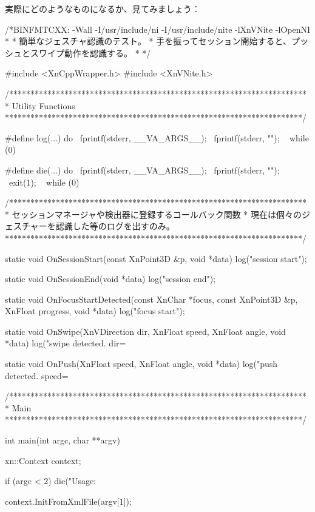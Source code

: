 \documentclass[mingoth,a4paper]{jsarticle}
\begin{document}
実際にどのようなものになるか、見てみましょう：
\begin{commandline}
/*BINFMTCXX: -Wall -I/usr/include/ni -I/usr/include/nite -lXnVNite -lOpenNI
 *
 * 簡単なジェスチャ認識のテスト。
 * 手を振ってセッション開始すると、プッシュとスワイプ動作を認識する。
 *
 */

#include <XnCppWrapper.h>
#include <XnVNite.h>

/**********************************************************************
 * Utility Functions
 **********************************************************************/

#define log(...) do {                       \
        fprintf(stderr, __VA_ARGS__);       \
        fprintf(stderr, "\n");              \
    } while (0)

#define die(...) do {                       \
        fprintf(stderr, __VA_ARGS__);       \
        fprintf(stderr, "\n");              \
        exit(1);                            \
    } while (0)

/**********************************************************************
 * セッションマネージャや検出器に登録するコールバック関数
 * 現在は個々のジェスチャーを認識した等のログを出すのみ。
 **********************************************************************/

static void
OnSessionStart(const XnPoint3D &p, void *data) {
    log("session start");
}

static void
OnSessionEnd(void *data) {
    log("session end");
}

static void
OnFocusStartDetected(const XnChar *focus,
                     const XnPoint3D &p, XnFloat progress, void *data) {
    log("focus start");
}

static void
OnSwipe(XnVDirection dir, XnFloat speed, XnFloat angle, void *data) {
    log("swipe detected. dir=%
}

static void
OnPush(XnFloat speed, XnFloat angle, void *data) {
    log("push detected. speed=%
}

/**********************************************************************
 * Main
 **********************************************************************/

int
main(int argc, char **argv) {
    xn::Context context;

    if (argc < 2) {
        die("Usage: %
    }

    context.InitFromXmlFile(argv[1]);

}
\end{commandline}
\end{document}
